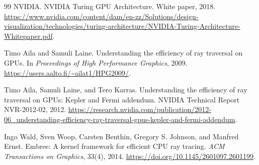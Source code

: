 \documentclass[11pt]{article}
\begin{document}
\begin{thebibliography}{99}
NVIDIA.
\newblock NVIDIA Turing GPU Architecture.
\newblock White paper, 2018.
\newblock \url{https://www.nvidia.com/content/dam/en-zz/Solutions/design-visualization/technologies/turing-architecture/NVIDIA-Turing-Architecture-Whitepaper.pdf}.

Timo Aila and Samuli Laine.
\newblock Understanding the efficiency of ray traversal on GPUs.
\newblock In \emph{Proceedings of High Performance Graphics}, 2009.
\newblock \url{https://users.aalto.fi/~ailat1/HPG2009/}.

Timo Aila, Samuli Laine, and Tero Karras.
\newblock Understanding the efficiency of ray traversal on GPUs: Kepler and
Fermi addendum.
\newblock NVIDIA Technical Report NVR-2012-02, 2012.
\newblock \url{https://research.nvidia.com/publication/2012-06_understanding-efficiency-ray-traversal-gpus-kepler-and-fermi-addendum}.

Ingo Wald, Sven Woop, Carsten Benthin, Gregory S. Johnson, and Manfred Ernst.
\newblock Embree: A kernel framework for efficient CPU ray tracing.
\newblock \emph{ACM Transactions on Graphics}, 33(4), 2014.
\newblock \url{https://doi.org/10.1145/2601097.2601199}.

\end{thebibliography}
\end{document}
